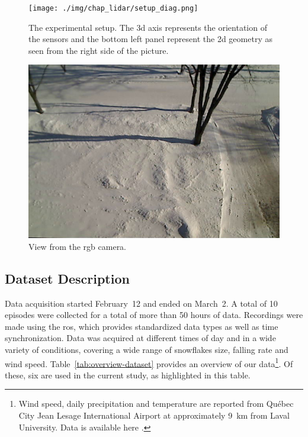 \begin{figure}
    \centering
    \texttt{[image: ./img/chap\_lidar/setup\_diag.png]}
    \caption[The experimental setup.]{The experimental setup. The \gls*{3d} axis represents the orientation of the sensors and the bottom left panel represent the \gls*{2d} geometry as seen from the right side of the picture.}
    \label{fig:setup}
\end{figure}

\begin{figure}
    \centering
    \includegraphics[width=0.80\linewidth]{./img/chap_lidar/camera_view.jpg}
    \caption[View from the camera.]{View from the \gls*{rgb} camera.}
    \label{fig:view}
\end{figure}

\subsection{Dataset Description}
Data acquisition started February~12 and ended on March~2. A total of 10 episodes were collected for a total of more than 50 hours of data. Recordings were made using the \gls*{ros}\citep{ROSWeb}, which provides standardized data types as well as time synchronization. Data was acquired at different times of day and in a wide variety of conditions, covering a wide range of snowflakes size, falling rate and wind speed.  Table~\ref{tab:overview-dataset} provides an overview of our data\footnote{Wind speed, daily precipitation and temperature are reported from Québec City Jean Lesage International Airport at approximately \SI{9}{\km} from Laval University. Data is available here \citep{WeatherCanada}.}. Of these, six are used in the current study, as highlighted in this table.


